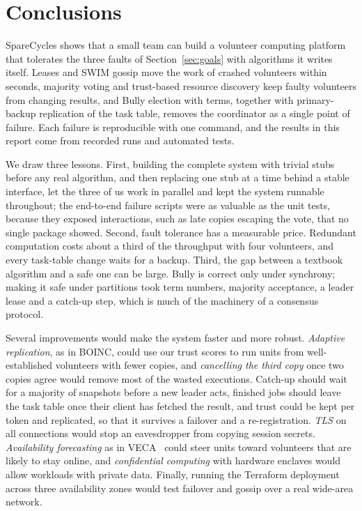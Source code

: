 \section{Conclusions}
\label{sec:conclusions}

SpareCycles shows that a small team can build a volunteer computing platform that tolerates the three faults of Section~\ref{sec:goals} with algorithms it writes itself. Leases and SWIM gossip move the work of crashed volunteers within seconds, majority voting and trust-based resource discovery keep faulty volunteers from changing results, and Bully election with terms, together with primary-backup replication of the task table, removes the coordinator as a single point of failure. Each failure is reproducible with one command, and the results in this report come from recorded runs and automated tests.

We draw three lessons. First, building the complete system with trivial stubs before any real algorithm, and then replacing one stub at a time behind a stable interface, let the three of us work in parallel and kept the system runnable throughout; the end-to-end failure scripts were as valuable as the unit tests, because they exposed interactions, such as late copies escaping the vote, that no single package showed. Second, fault tolerance has a measurable price. Redundant computation costs about a third of the throughput with four volunteers, and every task-table change waits for a backup. Third, the gap between a textbook algorithm and a safe one can be large. Bully is correct only under synchrony; making it safe under partitions took term numbers, majority acceptance, a leader lease and a catch-up step, which is much of the machinery of a consensus protocol.

Several improvements would make the system faster and more robust. \emph{Adaptive replication}, as in BOINC, could use our trust scores to run units from well-established volunteers with fewer copies, and \emph{cancelling the third copy} once two copies agree would remove most of the wasted executions. Catch-up should wait for a majority of snapshots before a new leader acts, finished jobs should leave the task table once their client has fetched the result, and trust could be kept per token and replicated, so that it survives a failover and a re-registration. \emph{TLS} on all connections would stop an eavesdropper from copying session secrets. \emph{Availability forecasting} as in VECA~\cite{yeddulapalli2024veca} could steer units toward volunteers that are likely to stay online, and \emph{confidential computing} with hardware enclaves would allow workloads with private data. Finally, running the Terraform deployment across three availability zones would test failover and gossip over a real wide-area network.
